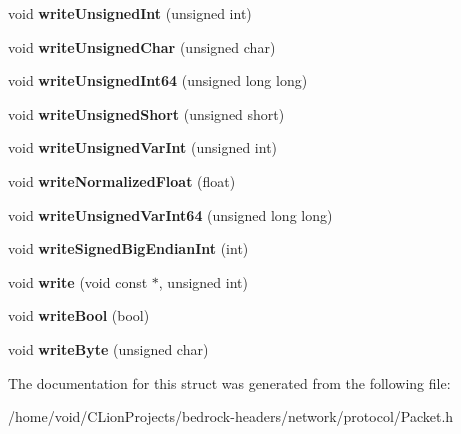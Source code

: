 \begin{DoxyCompactItemize}
\item 
\mbox{\label{struct_binary_stream_a3dbb79550a7689f8c6c9016a55ce44ff}} 
void {\bfseries write\+Unsigned\+Int} (unsigned int)
\item 
\mbox{\label{struct_binary_stream_ae0157192f0ccd9a01164b1ab854328e3}} 
void {\bfseries write\+Unsigned\+Char} (unsigned char)
\item 
\mbox{\label{struct_binary_stream_ac81c63d278debecb4478dcc589d35341}} 
void {\bfseries write\+Unsigned\+Int64} (unsigned long long)
\item 
\mbox{\label{struct_binary_stream_a31079dcea8fc25b4e5621b2ffc30bf9f}} 
void {\bfseries write\+Unsigned\+Short} (unsigned short)
\item 
\mbox{\label{struct_binary_stream_a08adff75dda0468319e1d18f0ebb49f6}} 
void {\bfseries write\+Unsigned\+Var\+Int} (unsigned int)
\item 
\mbox{\label{struct_binary_stream_aed537fd19241c1b03d5cbe0e337dc52f}} 
void {\bfseries write\+Normalized\+Float} (float)
\item 
\mbox{\label{struct_binary_stream_a878019977ea7815b125dd9e6e822a290}} 
void {\bfseries write\+Unsigned\+Var\+Int64} (unsigned long long)
\item 
\mbox{\label{struct_binary_stream_aa01f8feef8fe86dc6b1bf9b6076c1277}} 
void {\bfseries write\+Signed\+Big\+Endian\+Int} (int)
\item 
\mbox{\label{struct_binary_stream_a342c3ba6f93a582634c0913c9473aa06}} 
void {\bfseries write} (void const $\ast$, unsigned int)
\item 
\mbox{\label{struct_binary_stream_a518192d84fb5c251014b265ae66adb2e}} 
void {\bfseries write\+Bool} (bool)
\item 
\mbox{\label{struct_binary_stream_aa9f6506e7b206b3f36ab663e7c8de84e}} 
void {\bfseries write\+Byte} (unsigned char)
\end{DoxyCompactItemize}


The documentation for this struct was generated from the following file\+:\begin{DoxyCompactItemize}
\item 
/home/void/\+C\+Lion\+Projects/bedrock-\/headers/network/protocol/Packet.\+h\end{DoxyCompactItemize}
